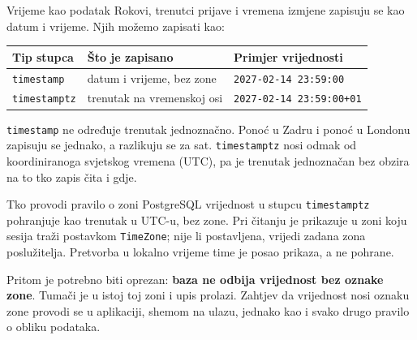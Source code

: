 \begin{frame}{Vrijeme kao podatak}
Rokovi, trenutci prijave i vremena izmjene zapisuju se kao datum i vrijeme. Njih možemo zapisati kao:

\vspace{0.6em}
\begin{center}
{\small
\setlength{\tabcolsep}{8pt}
\renewcommand{\arraystretch}{1.4}
\begin{tabular}{@{}lll@{}}
  \toprule
  \textbf{Tip stupca} & \textbf{Što je zapisano} & \textbf{Primjer vrijednosti} \\
  \midrule
  \texttt{timestamp}   & datum i vrijeme, bez zone & \texttt{2027-02-14 23:59:00} \\
  \texttt{timestamptz} & trenutak na vremenskoj osi & \texttt{2027-02-14 23:59:00+01} \\
  \bottomrule
\end{tabular}
}
\end{center}

\vspace{0.6em}
\texttt{timestamp} ne određuje trenutak jednoznačno. Ponoć u Zadru i ponoć u Londonu zapisuju se jednako, a razlikuju se za sat. \texttt{timestamptz} nosi odmak od koordiniranoga svjetskog vremena (UTC), pa je trenutak jednoznačan bez obzira na to tko zapis čita i gdje.
\end{frame}

\begin{frame}{Tko provodi pravilo o zoni}
PostgreSQL vrijednost u stupcu \texttt{timestamptz} pohranjuje kao trenutak u UTC-u, bez zone. Pri čitanju je prikazuje u zoni koju sesija traži postavkom \texttt{TimeZone}; nije li postavljena, vrijedi zadana zona poslužitelja. Pretvorba u lokalno vrijeme time je posao prikaza, a ne pohrane.

\vspace{0.5em}
Pritom je potrebno biti oprezan: \textbf{baza ne odbija vrijednost bez oznake zone}. Tumači je u istoj toj zoni i upis prolazi. Zahtjev da vrijednost nosi oznaku zone provodi se u aplikaciji, shemom na ulazu, jednako kao i svako drugo pravilo o obliku podataka.
\end{frame}


